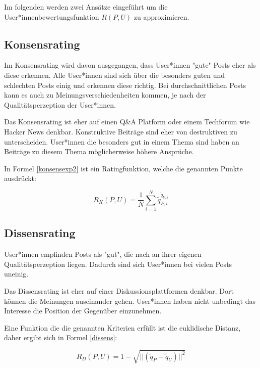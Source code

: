 Im folgenden werden zwei Ansätze eingeführt um die User*innenbewertungsfunktion $R(P,U)$ zu approximieren.
 
\subsection{Konsensrating}

Im Konsensrating wird davon ausgegangen, dass User*innen "gute" Posts eher als diese erkennen. Alle User*innen sind sich über die besonders guten und schlechten Posts einig und erkennen diese richtig. Bei durchschnittlichen Posts kann es auch zu Meinungsverschiedenheiten kommen, je nach der Qualitätsperzeption der User*innen.

Das Konsensrating ist eher auf einen Q\&A Platform oder einem Techforum wie Hacker News denkbar. Konstruktive Beiträge sind eher von destruktiven zu unterscheiden. User*innen die besonders gut in einem Thema sind haben an Beiträge zu diesem Thema möglicherweise höhere Ansprüche.


In Formel \ref{konsensexp2} ist ein Ratingfunktion, welche die genannten Punkte ausdrückt:

\begin{equation}
\label{konsensexp2}
R_K(P,U) = \frac{1}{N}\sum_{i = 1}^{N}\tilde{q}_{P,i}^{\tilde{q}_{U,i}}
\end{equation}



\subsection{Dissensrating}

User*innen empfinden Posts als "gut", die nach an ihrer eigenen Qualitätsperzeption liegen. Dadurch sind sich User*innen bei vielen Posts uneinig.

Das Dissensrating ist eher auf einer Diskussionsplattformen denkbar. Dort können die Meinungen auseinander gehen. User*innen haben nicht unbedingt das Interesse die Position der Gegenüber einzunehmen. 

Eine Funktion die die genannten Kriterien erfüllt ist die euklidische Distanz, daher ergibt sich in Formel \ref{dissens}:


\begin{equation}
\label{dissens}
R_D(P,U) = 1 - \sqrt{||(\tilde{q}_P - \tilde{q}_U)||^2}
\end{equation}
